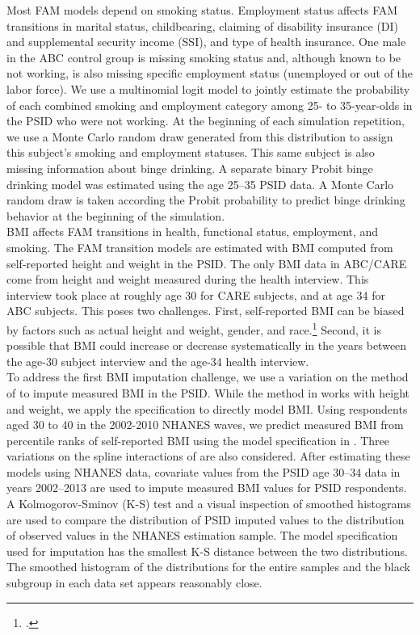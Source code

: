 \noindent Most FAM models depend on smoking status. Employment status affects FAM transitions in marital status, childbearing, claiming of disability insurance (DI) and supplemental security income (SSI), and type of health insurance.
One male in the ABC control group is missing smoking status and, although known to be not working, is also missing specific employment status (unemployed or out of the labor force).
 We use a multinomial logit model to jointly estimate the probability of each combined smoking and employment category among 25- to 35-year-olds in the PSID who were not working. At the beginning of each simulation repetition, we use a Monte Carlo random draw generated from this distribution to assign this subject's smoking and employment statuses. This same subject is also missing information about binge drinking. A separate binary Probit binge drinking model was estimated using the age 25--35 PSID data. A Monte Carlo random draw is taken according the Probit probability to predict binge drinking behavior at the beginning of the simulation. \\

\noindent BMI affects FAM transitions in health, functional status, employment, and smoking.
The FAM transition models are estimated with BMI computed from self-reported height and weight in the PSID.
The only BMI data in ABC/CARE come from height and weight measured during the health interview. This interview took place at roughly age 30 for CARE subjects, and at age 34 for ABC subjects.
This poses two challenges.
First, self-reported BMI can be biased by factors such as actual height and weight, gender, and race.\footnote{\citet{Cawley_2004_JHR}.}
Second, it is possible that BMI could increase or decrease systematically in the years between the age-30 subject interview and the age-34 health interview. \\

\noindent To address the first BMI imputation challenge, we use a variation on the method of \citet*{Courtemanche_etal_2015_Adjusting-Body-Mass} to impute measured BMI in the PSID.
While the method in \citet{Courtemanche_etal_2015_Adjusting-Body-Mass} works with height and weight, we apply the specification to directly model BMI. Using respondents aged 30 to 40 in the 2002-2010 NHANES waves, we predict measured BMI from percentile ranks of self-reported BMI using the model specification in \citet{Courtemanche_etal_2015_Adjusting-Body-Mass}. Three variations
on the spline interactions of \citet{Courtemanche_etal_2015_Adjusting-Body-Mass} are also considered. After estimating these models using NHANES data, covariate values from the PSID
age 30--34 data in years 2002--2013 are used to impute measured BMI values for PSID respondents. A Kolmogorov-Sminov (K-S) test and a visual inspection of smoothed histograms are used to compare the distribution of PSID imputed values to the distribution of observed values in the NHANES estimation sample. The model specification used for imputation has the smallest K-S distance between the two distributions. The smoothed histogram of the distributions for the entire samples and the black subgroup in each data set appears reasonably close.  \\

